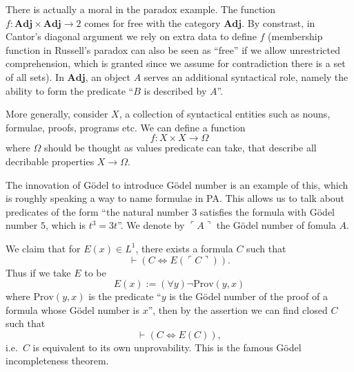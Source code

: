 \documentclass[a4paper]{article}
\renewcommand{\c}[1]{\mathbf{#1}}
\begin{document}
There is actually a moral in the paradox example. The function \(f: \c{Adj} \times \c{Adj} \to 2\) comes for free with the category \(\c{Adj}\). By constrast, in Cantor's diagonal argument we rely on extra data to define \(f\) (membership function in Russell's paradox can also be seen as ``free'' if we allow unrestricted comprehension, which is granted since we assume for contradiction there is a set of all sets). In \(\c{Adj}\), an object \(A\) serves an additional syntactical role, namely the ability to form the predicate ``\(B\) is described by \(A\)''.

More generally, consider \(X\), a collection of syntactical entities such as nouns, formulae, proofs, programs etc. We can define a function
\[
  f: X \times X \to \Omega
\]
where \(\Omega\) should be thought as values predicate can take, that describe all decribable properties \(X \to \Omega\).

The innovation of Gödel to introduce Gödel number is an example of this, which is roughly speaking a way to name formulae in PA. This allows us to talk about predicates of the form ``the natural number \(3\) satisfies the formula with Gödel number \(5\), which is \(t^3 = 3t\)''. We denote by \(\ulcorner A \urcorner\) the Gödel number of fomula \(A\).

We claim that for \(E(x) \in L^1\), there exists a formula \(C\) such that
\[
  \vdash (C \iff E(\ulcorner C \urcorner)).
\]
Thus if we take \(E\) to be
\[
  E(x) := (\forall y)\neg \text{Prov}(y, x)
\]
where \(\text{Prov}(y, x)\) is the predicate ``\(y\) is the Gödel number of the proof of a formula whose Gödel number is \(x\)'', then by the assertion we can find closed \(C\) such that
\[
  \vdash (C \iff E(C)),
\]
i.e.\ \(C\) is equivalent to its own unprovability. This is the famous Gödel incompleteness theorem.
\end{document}
